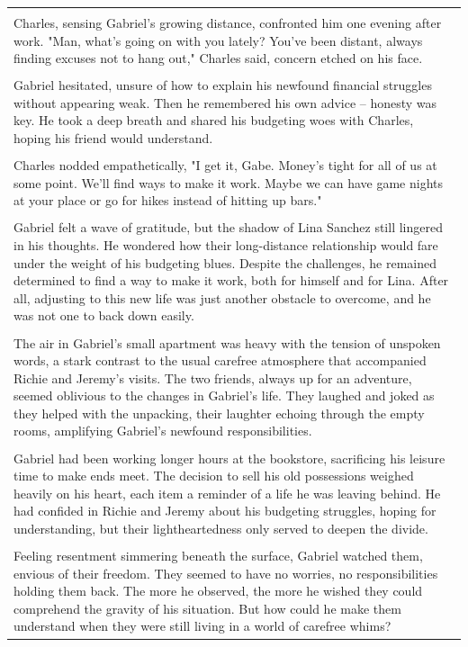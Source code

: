 \begin{small}
\begin{longtable}{p{}}
\\
\\
Charles, sensing Gabriel's growing distance, confronted him one evening after work. "Man, what's going on with you lately? You've been distant, always finding excuses not to hang out," Charles said, concern etched on his face.
\\
\\
Gabriel hesitated, unsure of how to explain his newfound financial struggles without appearing weak. Then he remembered his own advice – honesty was key. He took a deep breath and shared his budgeting woes with Charles, hoping his friend would understand.
\\
\\
Charles nodded empathetically, "I get it, Gabe. Money's tight for all of us at some point. We'll find ways to make it work. Maybe we can have game nights at your place or go for hikes instead of hitting up bars."
\\
\\
Gabriel felt a wave of gratitude, but the shadow of Lina Sanchez still lingered in his thoughts. He wondered how their long-distance relationship would fare under the weight of his budgeting blues. Despite the challenges, he remained determined to find a way to make it work, both for himself and for Lina. After all, adjusting to this new life was just another obstacle to overcome, and he was not one to back down easily.
\\
\\
The air in Gabriel's small apartment was heavy with the tension of unspoken words, a stark contrast to the usual carefree atmosphere that accompanied Richie and Jeremy's visits. The two friends, always up for an adventure, seemed oblivious to the changes in Gabriel's life. They laughed and joked as they helped with the unpacking, their laughter echoing through the empty rooms, amplifying Gabriel's newfound responsibilities.
\\
\\
Gabriel had been working longer hours at the bookstore, sacrificing his leisure time to make ends meet. The decision to sell his old possessions weighed heavily on his heart, each item a reminder of a life he was leaving behind. He had confided in Richie and Jeremy about his budgeting struggles, hoping for understanding, but their lightheartedness only served to deepen the divide.
\\
\\
Feeling resentment simmering beneath the surface, Gabriel watched them, envious of their freedom. They seemed to have no worries, no responsibilities holding them back. The more he observed, the more he wished they could comprehend the gravity of his situation. But how could he make them understand when they were still living in a world of carefree whims?

\end{longtable}
\end{small}
